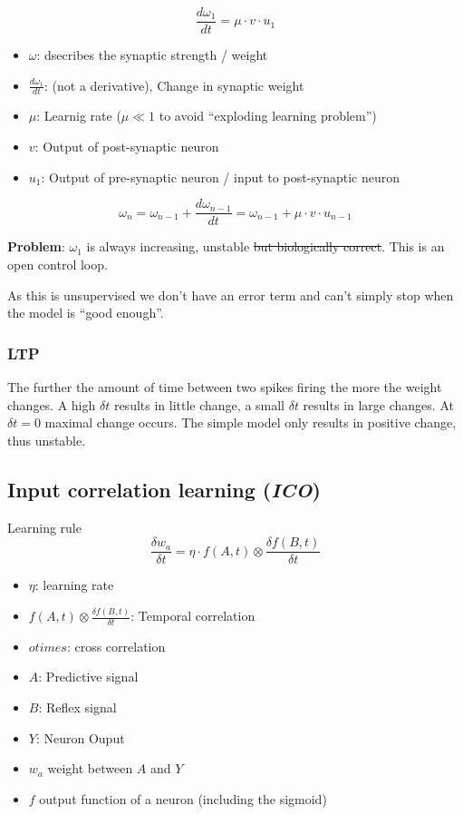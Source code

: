 \documentclass[
    fontsize      = 11pt,
    paper         = a4,
    twoside       = false,
    parskip       = half,
    pagesize      = false,
]{scrartcl}
\providecommand{\tightlist}{%
  \setlength{\itemsep}{0pt}\setlength{\parskip}{0pt}}
\begin{document}
\[\frac{\mathit{d}\omega_1}{\mathit{d}t} = \mu \cdot v \cdot u_1\]

\begin{itemize}
\tightlist
\item
  \(\omega\): dsecribes the synaptic strength / weight
\item
  \(\frac{\mathit{d}\omega_1}{\mathit{d}t}\): (not a derivative), Change
  in synaptic weight
\item
  \(\mu\): Learnig rate (\(\mu \ll 1\) to avoid ``exploding learning
  problem'')
\item
  \(v\): Output of post-synaptic neuron
\item
  \(u_1\): Output of pre-synaptic neuron / input to post-synaptic neuron
\end{itemize}

\[\omega_n = \omega_{n-1} + \frac{\mathit{d}\omega_{n-1}}{\mathit{d}t} = \omega_{n-1} + \mu \cdot v \cdot u_{n-1} \]

\textbf{Problem}: \(\omega_1\) is always increasing, unstable \sout{but
biologically correct}. This is an open control loop.

As this is unsupervised we don't have an error term and can't simply
stop when the model is ``good enough''.

\hypertarget{ltp}{%
\subsubsection{LTP}\label{ltp}}

The further the amount of time between two spikes firing the more the
weight changes. A high \(\delta t\) results in little change, a small
\(\delta t\) results in large changes. At \(\delta t = 0\) maximal
change occurs. The simple model only results in positive change, thus
unstable.

\hypertarget{input-correlation-learning-ico}{%
\subsection{\texorpdfstring{Input correlation learning
(\emph{ICO})}{Input correlation learning (ICO)}}\label{input-correlation-learning-ico}}

Learning rule
\[\frac{\delta w_a}{\delta t} = \eta \cdot f \left( A, t\right) \otimes \frac{\delta f \left( B, t\right) }{\delta t}\]

\begin{itemize}
\tightlist
\item
  \(\eta\): learning rate
\item
  \(f\left( A, t\right) \otimes \frac{\delta f \left( B, t\right) }{\delta t}\):
  Temporal correlation
\item
  \(otimes\): cross correlation
\item
  \(A\): Predictive signal
\item
  \(B\): Reflex signal
\item
  \(Y\): Neuron Ouput
\item
  \(w_a\) weight between \(A\) and \(Y\)
\item
  \(f\) output function of a neuron (including the sigmoid)
\end{itemize}
\end{document}
